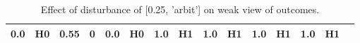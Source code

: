 \begin{table}
\begin{tabular}{l|cc|cc|cc|cc|cc|cc|cc}
\cellcolor{Bittersweet}0.0&\cellcolor{Bittersweet}H0&\cellcolor{Bittersweet}0.55&\cellcolor{Bittersweet}0&\cellcolor{Bittersweet}0.0&\cellcolor{Bittersweet}H0&\cellcolor{Bittersweet}1.0&\cellcolor{Bittersweet}H1&\cellcolor{Bittersweet}1.0&\cellcolor{Bittersweet}H1&\cellcolor{Bittersweet}1.0&\cellcolor{Bittersweet}H1&\cellcolor{Bittersweet}1.0&\cellcolor{Bittersweet}H1\\\bottomrule\end{tabular}\caption{Effect of disturbance of [0.25, 'arbit'] on weak view of outcomes.}\end{table}